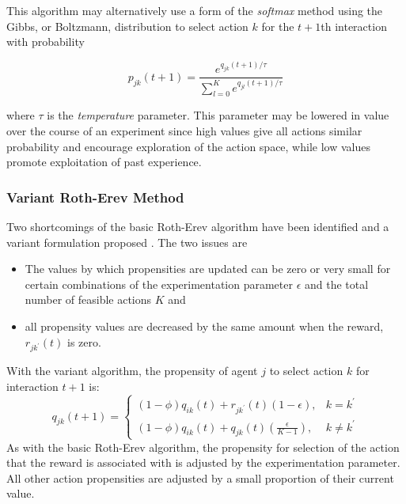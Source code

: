 This algorithm may alternatively use a form of the \textit{softmax} method
\cite{suttonbarto:1998} using the Gibbs, or Boltzmann, distribution to select
action $k$ for the $t+1$th interaction with probability

\begin{equation}
p_{jk}(t+1) = \frac{e^{q_{jk}(t+1)/\tau}}{\sum_{l=0}^K e^{q_{jl}(t+1)/\tau}}
\end{equation}

where $\tau$ is the \textit{temperature} parameter.  This parameter may be
lowered in value over the course of an experiment since high values give all
actions similar probability and encourage exploration of the action space,
while low values promote exploitation of past experience.

\subsubsection{Variant Roth-Erev Method}
\label{sec:variant}
Two shortcomings of the basic Roth-Erev algorithm have been identified and a
variant formulation proposed \cite{nicolaisen:2001}.  The two issues are
\begin{itemize}
  \item The values by which propensities are updated can be zero or very small
  for certain combinations of the experimentation parameter $\epsilon$ and
  the total number of feasible actions $K$ and
  \item all propensity values are decreased by the same amount when the reward,
  $r_{jk^\prime}(t)$ is zero.
\end{itemize}
With the variant algorithm, the propensity of agent $j$ to select action $k$
for interaction $t+1$ is:
\begin{equation}
q_{jk}(t+1) =
\begin{cases}
(1-\phi)q_{ik}(t) + r_{jk^\prime}(t)(1-\epsilon), & \text{$k = k^\prime$} \\
(1-\phi)q_{ik}(t) + q_{jk}(t)(\frac{\epsilon}{K-1}), & \text{$k \ne
k^\prime$}
\end{cases}
\end{equation}
As with the basic Roth-Erev algorithm, the propensity for selection of the
action that the reward is associated with is adjusted by the experimentation
parameter.  All other action propensities are adjusted by a small proportion of
their current value.
